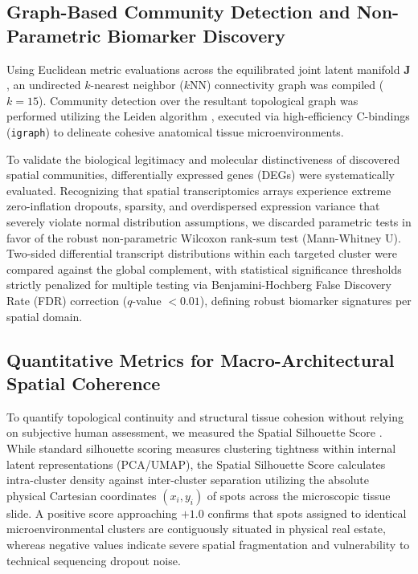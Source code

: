 \documentclass[11pt, a4paper]{article}
\begin{document}
\subsection{Graph-Based Community Detection and Non-Parametric Biomarker Discovery}
Using Euclidean metric evaluations across the equilibrated joint latent manifold $\mathbf{J}$, an undirected $k$-nearest neighbor ($k$NN) connectivity graph was compiled ($k=15$). Community detection over the resultant topological graph was performed utilizing the Leiden algorithm \cite{traag2019louvain}, executed via high-efficiency C-bindings (\texttt{igraph}) to delineate cohesive anatomical tissue microenvironments.

To validate the biological legitimacy and molecular distinctiveness of discovered spatial communities, differentially expressed genes (DEGs) were systematically evaluated. Recognizing that spatial transcriptomics arrays experience extreme zero-inflation dropouts, sparsity, and overdispersed expression variance that severely violate normal distribution assumptions, we discarded parametric tests in favor of the robust non-parametric Wilcoxon rank-sum test (Mann-Whitney U). Two-sided differential transcript distributions within each targeted cluster were compared against the global complement, with statistical significance thresholds strictly penalized for multiple testing via Benjamini-Hochberg False Discovery Rate (FDR) correction ($q$-value $< 0.01$), defining robust biomarker signatures per spatial domain.

\subsection{Quantitative Metrics for Macro-Architectural Spatial Coherence}
To quantify topological continuity and structural tissue cohesion without relying on subjective human assessment, we measured the Spatial Silhouette Score \cite{rousseeuw1987silhouettes}. While standard silhouette scoring measures clustering tightness within internal latent representations (PCA/UMAP), the Spatial Silhouette Score calculates intra-cluster density against inter-cluster separation utilizing the absolute physical Cartesian coordinates $(x_i, y_i)$ of spots across the microscopic tissue slide. A positive score approaching $+1.0$ confirms that spots assigned to identical microenvironmental clusters are contiguously situated in physical real estate, whereas negative values indicate severe spatial fragmentation and vulnerability to technical sequencing dropout noise.
\end{document}
